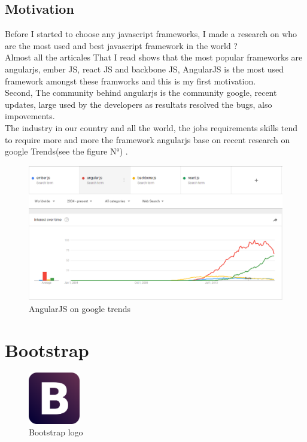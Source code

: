 \documentclass[12pt]{article}
\begin{document}
	\subsection{Motivation}
	Before I started to choose any javascript frameworks, I made a research on who are the most used and best javascript framework in the world ?
	\\
	Almost all the articales That I read shows that the most popular frameworks are \colorbox{mygray}{angularjs}, \colorbox{mygray}{ember JS}, \colorbox{mygray}{react JS} and \colorbox{mygray}{backbone JS}, AngularJS is the most used framework amongst these framworks and this is my first motivation.\\
	Second, The community behind angularjs is the community google, recent updates, large used by the developers as resultats resolved the bugs, also impovements.\\
	The industry in our country and all the world, the jobs requirements skills tend to require more and more the framework angularjs base on recent research on google Trends(see the figure N°) .
	 	\begin{figure}[h]
	 	\centering
	 	\includegraphics[width=1.0\textwidth]{AngularJS_statics_google_trends.png}
	 	\caption{AngularJS on google trends}
	 \end{figure}
	 
	
	\section{Bootstrap}
	\begin{figure}[h]
		\centering
		\includegraphics[width=0.20\textwidth]{Boostrap_logo.png}
		\caption{Bootstrap logo}
	\end{figure}
\end{document}
